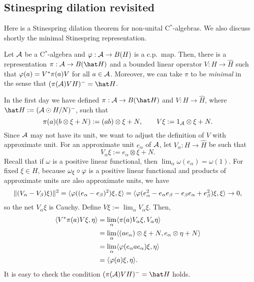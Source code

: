 \documentclass{../../small}
\begin{document}
\subsection{Stinespring dilation revisited}

Here is a Stinespring dilation theorem for non-unital C$^*$-algebras.
We also discuss shortly the minimal Stinespring representation.

\begin{thm}
Let $\mathcal{A}$ be a C$^*$-algebra and $\varphi:\mathcal{A}\to B(H)$ is a c.p.~map.
Then, there is a representation $\pi:\cA\to B(\hat H)$ and a bounded linear operator $V:H\to\hat H$ such that $\varphi(a)=V^*\pi(a)V$ for all $a\in\mathcal{A}$.
Moreover, we can take $\pi$ to be \emph{minimal} in the sense that $(\pi(\cA)VH)^-=\hat H$.
\end{thm}
\begin{pf}
In the first day we have defined $\pi:\cA\to B(\hat H)$ and $V:H\to\hat H$, where $\hat H:=(\cA\odot H/N)^-$, such that
\[\pi(a)(b\otimes\xi+N):=(ab)\otimes\xi+N,\qquad V\xi:=1_{\mathcal{A}}\otimes\xi+N.\]
Since $\mathcal{A}$ may not have its unit, we want to adjust the definition of $V$ with approximate unit.
For an approximate unit $e_\alpha$ of $\mathcal{A}$, let $V_\alpha:H\to\hat H$ be such that
\[V_\alpha\xi:=e_\alpha\otimes\xi+N.\]
Recall that if $\omega$ is a positive linear functional, then $\lim_\alpha\omega(e_\alpha)=\omega(1)$.
For fixed $\xi\in H$, because $\omega_\xi\circ\varphi$ is a positive linear functional and products of approximate units are also approximate units, we have
\[\|(V_\alpha-V_\beta)\xi)\|^2=\langle\varphi((e_\alpha-e_\beta)^2)\xi,\xi\rangle=\langle\varphi(e_\alpha^2-e_\alpha e_\beta-e_\beta e_\alpha+e_\beta^2)\xi,\xi\rangle\to0,\]
so the net $V_\alpha\xi$ is Cauchy.
Define $V\xi:=\lim_\alpha V_\alpha\xi$.
Then,
\begin{align*}
\langle V^*\pi(a)V\xi,\eta\rangle
&=\lim_\alpha\langle\pi(a)V_\alpha\xi,V_\alpha\eta\rangle\\
&=\lim_\alpha\langle(ae_\alpha)\otimes\xi+N,e_\alpha\otimes\eta+N\rangle\\
&=\lim_\alpha\langle\varphi(e_\alpha ae_\alpha)\xi,\eta\rangle\\
&=\langle\varphi(a)\xi,\eta\rangle.
\end{align*}
It is easy to check the condition $(\pi(\cA)VH)^-=\hat H$ holds.
\end{pf}
\end{document}
